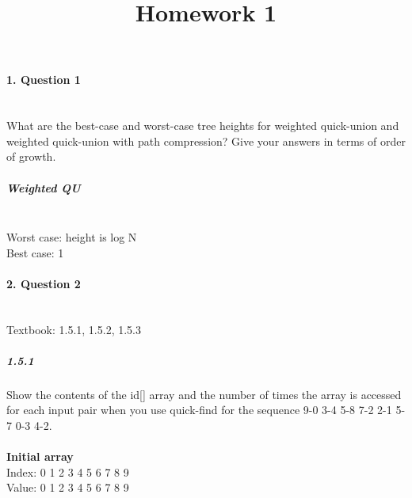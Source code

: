 \documentclass{article}
\begin{document}
\qtreecenterfalse
\title{Homework 1}
\date{}
\maketitle

\paragraph{\Large 1. Question 1}\mbox{}\\
What are the best-case and worst-case tree heights for weighted quick-union and weighted quick-union with path compression? Give your answers in terms of order of growth.
\subparagraph{\large Weighted QU}\mbox{}\\
\indent
	Worst case: height is log N\\
\indent
	Best case: 1


\paragraph{\Large 2. Question 2}\mbox{}\\
Textbook: 1.5.1, 1.5.2, 1.5.3

\subparagraph{\large 1.5.1} Show the contents of the id[] array and the number of times the array is accessed for each input pair when you use quick-find for the sequence 9-0 3-4 5-8 7-2 2-1 5-7 0-3 4-2.\\\\

\textbf{Initial array}\\
Index: \hspace{4pt}0 \hspace{4pt}1 \hspace{4pt}2 \hspace{4pt}3 \hspace{4pt}4 \hspace{4pt}5 \hspace{4pt}6 \hspace{4pt}7 \hspace{4pt}8 \hspace{4pt}9\\
Value: \hspace{4pt}0 \hspace{4pt}1 \hspace{4pt}2 \hspace{4pt}3 \hspace{4pt}4 \hspace{4pt}5 \hspace{4pt}6 \hspace{4pt}7 \hspace{4pt}8 \hspace{4pt}9
\end{document}
